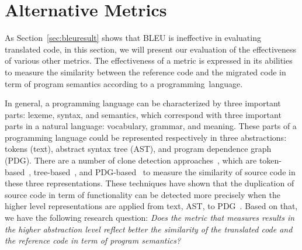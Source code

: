 \section{Alternative Metrics}
\label{sec:alternatives}
%

As Section~\ref{sec:bleuresult} shows that BLEU is ineffective in
evaluating translated code, in this section, we will present our
evaluation of the effectiveness of various other metrics. The
effectiveness of a metric is expressed in its abilities to measure the
similarity between the reference code and the migrated code in term of
program semantics according to a programming~language.


In general, a programming language can be characterized by three
important parts: lexeme, syntax, and semantics, which correspond
with three important parts in a natural language: vocabulary, grammar,
and meaning.
These parts of a programming language could be represented respectively in three 
abstractions: tokens (text), abstract syntax tree (AST), and program 
dependence graph (PDG).
%
There are a number of clone detection approaches~\cite{clone-tse07},
which are token-based~\cite{ccfinder},
tree-based~\cite{baxter98,deckard}, and PDG-based~\cite{deckard2} to
measure the similarity of source code in these three representations.
These techniques have shown that the duplication of source code in
term of functionality can be detected more precisely when the higher
level representations are applied from text, AST, to
PDG~\cite{clone-tse07,deckard2}.
Based on that, we have the following research question: \textit{Does
  the metric that measures results in the higher abstraction level
  reflect better the similarity of the translated code and the
  reference code in term of program semantics?}

